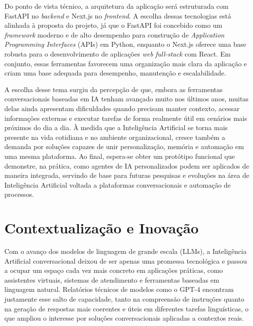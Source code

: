 \documentclass[12pt, openright, oneside, a4paper, brazil]{ads-unipac-abntex2}
\begin{document}
Do ponto de vista técnico, a arquitetura da aplicação será estruturada com FastAPI \cite{tiangolo2018fastapi} no \textit{backend} e Next.js \cite{verma2024nextjs} no \textit{frontend}. A escolha dessas tecnologias está alinhada à proposta do projeto, já que o FastAPI foi concebido como um \textit{framework} moderno e de alto desempenho para construção de \textit{Application Programming Interfaces} (APIs) em Python, enquanto o Next.js oferece uma base robusta para o desenvolvimento de aplicações \textit{web} \textit{full-stack} com React. Em conjunto, essas ferramentas favorecem uma organização mais clara da aplicação e criam uma base adequada para desempenho, manutenção e escalabilidade. 

A escolha desse tema surgiu da percepção de que, embora as ferramentas conversacionais baseadas em IA tenham avançado muito nos últimos anos, muitas delas ainda apresentam dificuldades quando precisam manter contexto, acessar informações externas e executar tarefas de forma realmente útil em cenários mais próximos do dia a dia. À medida que a Inteligência Artificial se torna mais presente na vida cotidiana e no ambiente organizacional, cresce também a demanda por soluções capazes de unir personalização, memória e automação em uma mesma plataforma. Ao final, espera-se obter um protótipo funcional que demonstre, na prática, como agentes de IA personalizados podem ser aplicados de maneira integrada, servindo de base para futuras pesquisas e evoluções na área de Inteligência Artificial voltada a plataformas conversacionais e automação de processos. 

 

\chapter[Contextualização e Inovação]{Contextualização e Inovação}
Com o avanço dos modelos de linguagem de grande escala (LLMs), a Inteligência Artificial conversacional deixou de ser apenas uma promessa tecnológica e passou a ocupar um espaço cada vez mais concreto em aplicações práticas, como assistentes virtuais, sistemas de atendimento e ferramentas baseadas em linguagem natural. Relatórios técnicos de modelos como o GPT-4 encontram justamente esse salto de capacidade, tanto na compreensão de instruções quanto na geração de respostas mais coerentes e úteis em diferentes tarefas linguísticas, o que ampliou o interesse por soluções conversacionais aplicadas a contextos reais. 
\end{document}
